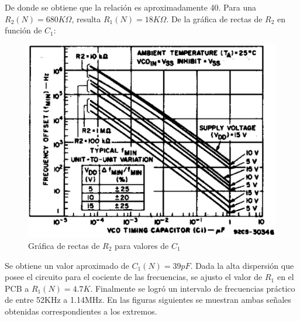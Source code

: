 \documentclass[assd_tp3_main.tex]{subfiles}
\begin{document}
De donde se obtiene que la relación es aproximadamente 40. Para una $R_2(N) = 680K\Omega$, resulta $R_1(N) = 18K\Omega$. De la gráfica de rectas de $R_2$ en función de $C_1$:

\begin{figure}[!ht]
\begin{centering}
\includegraphics[scale=0.4]{images/ej5/r2c1.png}
\par\end{centering}
\caption{Gráfica de rectas de $R_2$ para valores de $C_1$}
\end{figure}

Se obtiene un valor aproximado de $C_1(N) = 39pF$. Dada la alta dispersión que posee el circuito para el cociente de las frecuencias, se ajusto el valor de $R_1$ en el PCB a $R_1(N) = 4.7K$. Finalmente se logró un intervalo de frecuencias práctico de entre 52KHz a 1.14MHz. En las figuras siguientes se muestran ambas señales obtenidas correspondientes a los extremos.
\end{document}
